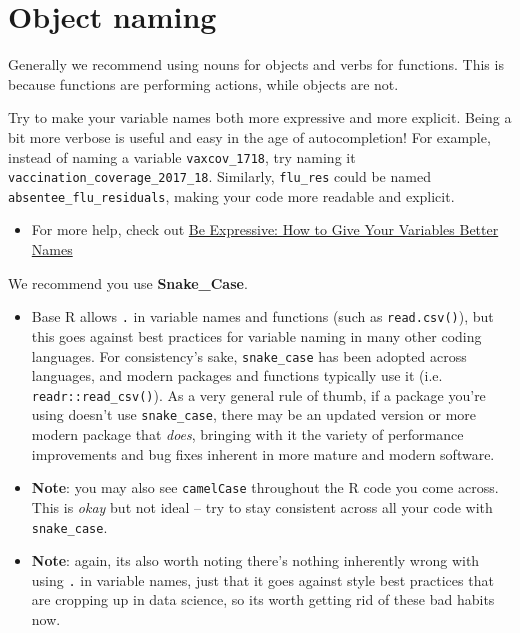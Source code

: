\documentclass[]{book}
\providecommand{\tightlist}{%
  \setlength{\itemsep}{0pt}\setlength{\parskip}{0pt}}
\begin{document}
\section{Object naming}\label{object-naming}

Generally we recommend using nouns for objects and verbs for functions.
This is because functions are performing actions, while objects are not.

Try to make your variable names both more expressive and more explicit.
Being a bit more verbose is useful and easy in the age of
autocompletion! For example, instead of naming a variable
\texttt{vaxcov\_1718}, try naming it
\texttt{vaccination\_coverage\_2017\_18}. Similarly, \texttt{flu\_res}
could be named \texttt{absentee\_flu\_residuals}, making your code more
readable and explicit.

\begin{itemize}
\tightlist
\item
  For more help, check out
  \href{https://spin.atomicobject.com/2017/11/01/good-variable-names/}{Be
  Expressive: How to Give Your Variables Better Names}
\end{itemize}

We recommend you use \textbf{Snake\_Case}.

\begin{itemize}
\item
  Base R allows \texttt{.} in variable names and functions (such as
  \texttt{read.csv()}), but this goes against best practices for
  variable naming in many other coding languages. For consistency's
  sake, \texttt{snake\_case} has been adopted across languages, and
  modern packages and functions typically use it (i.e.
  \texttt{readr::read\_csv()}). As a very general rule of thumb, if a
  package you're using doesn't use \texttt{snake\_case}, there may be an
  updated version or more modern package that \emph{does}, bringing with
  it the variety of performance improvements and bug fixes inherent in
  more mature and modern software.
\item
  \textbf{Note}: you may also see \texttt{camelCase} throughout the R
  code you come across. This is \emph{okay} but not ideal -- try to stay
  consistent across all your code with \texttt{snake\_case}.
\item
  \textbf{Note}: again, its also worth noting there's nothing inherently
  wrong with using \texttt{.} in variable names, just that it goes
  against style best practices that are cropping up in data science, so
  its worth getting rid of these bad habits now.
\end{itemize}
\end{document}
